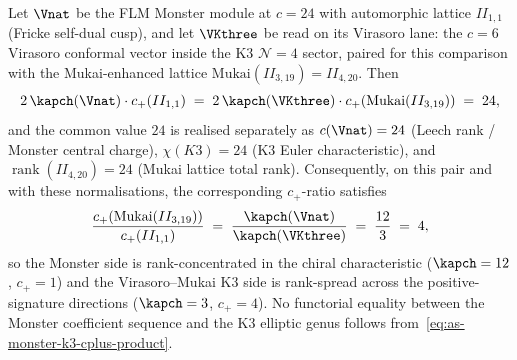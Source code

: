 \begin{theorem}
\label{thm:as-monster-k3-cplus-product-invariant}
%
%
%
Let $\Vnat$ be the FLM Monster module at $c = 24$ with automorphic
lattice $II_{1, 1}$ (Fricke self-dual cusp), and let $\VKthree$ be
read on its Virasoro lane: the $c=6$ Virasoro conformal vector inside
the K$3$ $\mathcal N{=}4$ sector, paired for this comparison with the
Mukai-enhanced lattice
$\mathrm{Mukai}(II_{3, 19}) = II_{4, 20}$.
Then
\begin{equation}
\label{eq:as-monster-k3-cplus-product}
 2\,\kapch(\Vnat) \cdot c_+(II_{1, 1})
 \;=\;
 2\,\kapch(\VKthree) \cdot c_+(\mathrm{Mukai}(II_{3, 19}))
 \;=\;
 24,
\end{equation}
and the common value $24$ is realised separately as
$c(\Vnat) = 24$ (Leech rank / Monster central charge),
$\chi(K3) = 24$ (K$3$ Euler characteristic), and
$\operatorname{rank}(II_{4, 20}) = 24$ (Mukai lattice total rank).
Consequently, on this pair and with these normalisations, the
corresponding $c_+$-ratio satisfies
\begin{equation}
\label{eq:as-cplus-ratio-from-product}
 \frac{c_+(\mathrm{Mukai}(II_{3, 19}))}{c_+(II_{1, 1})}
 \;=\;
 \frac{\kapch(\Vnat)}{\kapch(\VKthree)}
 \;=\;
 \frac{12}{3}
 \;=\;
 4,
\end{equation}
so the Monster side is rank-concentrated in the chiral
characteristic ($\kapch = 12$, $c_+ = 1$) and the Virasoro--Mukai
K$3$ side is rank-spread across the positive-signature directions
($\kapch = 3$, $c_+ = 4$). No functorial equality between the
Monster coefficient sequence and the K$3$ elliptic genus follows
from~\eqref{eq:as-monster-k3-cplus-product}.
\end{theorem}

